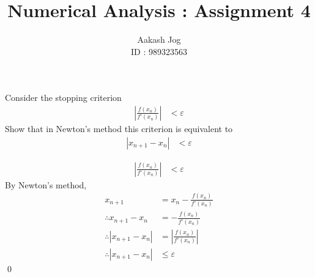 \documentclass[fleqn, a4paper, 11pt, oneside]{amsart}
\title{Numerical Analysis : Assignment 4}
\author
{
	Aakash Jog\\
	ID : 989323563
}
\date{\formatdate{10}{11}{2015}}
\theoremstyle{definition}
\theoremstyle{theorem}
\begin{document}

\maketitle

\begin{question}
	Consider the stopping criterion
	\begin{align*}
		\left| \frac{f(x_n)}{f'(x_n)} \right| & < \varepsilon
	\end{align*}
	Show that in Newton's method this criterion is equivalent to
	\begin{align*}
		|x_{n + 1} - x_n| & < \varepsilon
	\end{align*}
\end{question}

\begin{solution}
	\begin{align*}
		\left| \frac{f(x_n)}{f'(x_n)} \right| & < \varepsilon
	\end{align*}
	By Newton's method,
	\begin{align*}
		x_{n + 1}                    & = x_n - \frac{f(x_n)}{f'(x_n)}          \\
		\therefore x_{n + 1} - x_n   & = -\frac{f(x_n)}{f'(x_n)}               \\
		\therefore |x_{n + 1} - x_n| & = \left| \frac{f(x_n)}{f'(x_n)} \right| \\
		\therefore |x_{n + 1} - x_n| & \le \varepsilon
	\end{align*}
	\qed
\end{solution}
\end{document}

